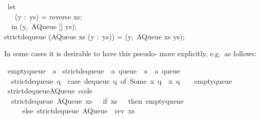 \begin{isabellebody}
\begin{isamarkuptext}
\hspace*{0pt} ~let {}\\
\hspace*{0pt} ~~~(y :~ys) = reverse xs;\\
\hspace*{0pt} ~{}~in (y,~AQueue [] ys);\\
\hspace*{0pt}strict{}dequeue (AQueue xs (y :~ys)) = (y,~AQueue xs ys);%
\end{isamarkuptext}%
\isamarkuptrue%
%
\endisatagquote
{\isafoldquote}%
%
\isadelimquote
%
\endisadelimquote
%
\begin{isamarkuptext}%
\noindent In some cases it is desirable to have this
  pseudo- more explicitly, e.g.~as follows:%
\end{isamarkuptext}%
\isamarkuptrue%
%
\isadelimquote
%
\endisadelimquote
%
\isatagquote
{}\isamarkupfalse%
\ empty{\isacharunderscore}queue\ {\isacharcolon}{\isacharcolon}\ {\isacharprime}a\isanewline
\isanewline
{}\isamarkupfalse%
\ strict{\isacharunderscore}dequeue{\isacharprime}\ {\isacharcolon}{\isacharcolon}\ {\isachardoublequoteopen}{\isacharprime}a\ queue\ {\isasymRightarrow}\ {\isacharprime}a\ {\isasymtimes}\ {\isacharprime}a\ queue{\isachardoublequoteclose}\ \isanewline
\ \ {\isachardoublequoteopen}strict{\isacharunderscore}dequeue{\isacharprime}\ q\ {\isacharequal}\ {\isacharparenleft}case\ dequeue\ q\ of\ {\isacharparenleft}Some\ x{\isacharcomma}\ q{\isacharprime}{\isacharparenright}\ {\isasymRightarrow}\ {\isacharparenleft}x{\isacharcomma}\ q{\isacharprime}{\isacharparenright}\ {\isacharbar}\ {\isacharunderscore}\ {\isasymRightarrow}\ empty{\isacharunderscore}queue{\isacharparenright}{\isachardoublequoteclose}\isanewline
\isanewline
{}\isamarkupfalse%
\ strict{\isacharunderscore}dequeue{\isacharprime}{\isacharunderscore}AQueue\ {\isacharbrackleft}code{\isacharbrackright}{\isacharcolon}\isanewline
\ \ {\isachardoublequoteopen}strict{\isacharunderscore}dequeue{\isacharprime}\ {\isacharparenleft}AQueue\ xs\ {\isacharbrackleft}{\isacharbrackright}{\isacharparenright}\ {\isacharequal}\ {\isacharparenleft}if\ xs\ {\isacharequal}\ {\isacharbrackleft}{\isacharbrackright}\ then\ empty{\isacharunderscore}queue\isanewline
\ \ \ \ \ else\ strict{\isacharunderscore}dequeue{\isacharprime}\ {\isacharparenleft}AQueue\ {\isacharbrackleft}{\isacharbrackright}\ {\isacharparenleft}rev\ xs{\isacharparenright}{\isacharparenright}{\isacharparenright}{\isachardoublequoteclose}\isanewline

\end{isabellebody}
